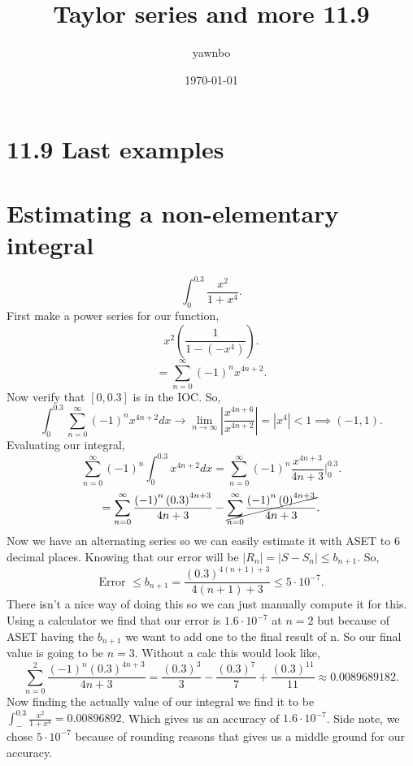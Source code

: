\documentclass{report}
\title{Taylor series and more 11.9}
\author{yawnbo}
\date{\today}
\begin{document}
\maketitle
\section{11.9 Last examples}%
\label{sec:11.9 Last example}
\section*{Estimating a non-elementary integral}
\[
\int_{ 0 }^{ 0.3 } \frac{ x^2 }{ 1+x^{ 4 } }
.\] 
First make a power series for our function,
\[
x^2\left( \frac{ 1 }{ 1-\left( -x^{ 4 } \right)  }  \right) 
.\] 
\[
=\sum_{ n=0 } ^{ \infty } \left( -1 \right) ^{ n }x^{ 4n+2 }
.\] 
Now verify that $ \left[ 0,0.3 \right]  $ is in the IOC. So,
\[
\int_{ 0 }^{ 0.3 } \sum_{ n=0 } ^{ \infty } \left( -1 \right) ^{ n }x^{ 4n+2 }dx \to \lim_{ n \to \infty} \left| \frac{ x^{ 4n+6 } }{ x^{ 4n+2 } } \right|= \left| x^{ 4 } \right| < 1 \implies \left( -1,1 \right) 
.\] 
Evaluating our integral,
\[
\sum_{ n=0 } ^{ \infty } \left( -1 \right) ^{ n }\int_{ 0 }^{ 0.3 } x^{ 4n+2 }dx = \sum_{ n=0 } ^{ \infty } \left( -1 \right) ^{ n } \frac{ x^{ 4n+3 } }{ 4n + 3 } \bigg| _{ 0 }^{ 0.3 }
.\] 
\[
	=\sum_{ n=0 } ^{ \infty } \frac{ \left( -1 \right) ^{ n } \left( 0.3 \right) ^{ 4n+3 } }{ 4n+3 } - \cancel{\sum_{ n=0 } ^{ \infty } \frac{ \left( -1 \right) ^{ n }\left( 0 \right) ^{ 4n+3 } }{ 4n+3 }}
.\] 
Now we have an alternating series so we can easily estimate it with ASET to 6 decimal places. Knowing that our error will be $ \left| R_n \right|= \left| S-S_n \right| \le b_{ n+1 } $. So,
\[
\text{Error }\le b_{ n+1 } = \frac{ \left( 0.3 \right) ^{ 4\left( n+1 \right) +3 } }{ 4\left( n+1 \right) +3 } \le 5\cdot 10^{ -7 }
.\] 
There isn't a nice way of doing this so we can just manually compute it for this. Using a calculator we find that our error is $ 1.6\cdot 10^{ -7 } $ at $ n=2 $ but because of ASET having the $ b_{ n+1 } $ we want to add one to the final result of n. So our final value is going to be $ n=3 $. Without a calc this would look like,
\[
\sum_{ n=0 } ^{ 2 } \frac{ \left( -1 \right) ^{ n }\left( 0.3 \right) ^{ 4n+3 } }{ 4n+3 } = \frac{ \left( 0.3 \right) ^{ 3 } }{ 3 } - \frac{ \left( 0.3 \right) ^{ 7 } }{ 7 } + \frac{ \left( 0.3 \right) ^{ 11 } }{ 11 } \approx 0.0089689182
.\] 
\newpage
Now finding the actually value of our integral we find it to be $ \int_{ - }^{ 0.3 } \frac{ x^2 }{ 1+x^{ 4 } } = 0.00896892$. Which gives us an accuracy of $ 1.6\cdot 10^{ -7 } $. Side note, we chose $ 5\cdot 10^{ -7 } $ because of rounding reasons that gives us a middle ground for our accuracy. \\
\end{document}

